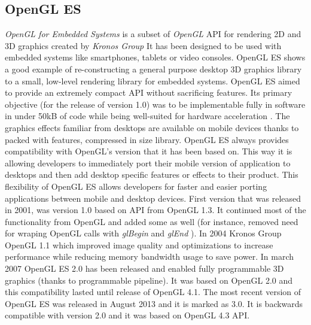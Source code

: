 \subsection{OpenGL ES}
\emph{OpenGL for Embedded Systems} \cite{opengles_kronos} is a subset of \emph{OpenGL} \cite{opengl_kronos} API for rendering 2D and 3D graphics created by \emph{Kronos Group} \cite{kronos_group} 
It has been designed to be used with embedded systems like smartphones, tablets or video consoles.
OpenGL ES shows a good example of re-constructing a general purpose desktop 3D graphics library to a small, low-level rendering library for embedded systems.
OpenGL ES aimed to provide an extremely compact API without sacrificing features.
Its primary objective (for the release of version 1.0) was to be implementable fully in software in under 50kB of code while being well-suited for hardware acceleration \cite{mobile_3d_graphics_with_OGLES_M3G}.
The graphics effects familiar from desktops are available on mobile devices thanks to packed with features, compressed in size library.
\newline OpenGL ES always provides compatibility with OpenGL's version that it has been based on.
This way it is allowing developers to immediately port their mobile version of application to desktops and then add desktop specific features or effects to their product.
This flexibility of OpenGL ES allows developers for faster and easier porting applications between mobile and desktop devices.
\newline First version that was released in 2001, was version 1.0 based on API from OpenGL 1.3.
It continued most of the functionality from OpenGL and added some as well (for instance, removed need for wraping OpenGL calls with \emph{glBegin} and \emph{glEnd} ).
\newline In 2004 Kronos Group OpenGL 1.1 which improved image quality and optimizations to increase performance while reducing memory bandwidth usage to save power.
\newline In march 2007 OpenGL ES 2.0 has been released and enabled fully programmable 3D graphics (thanks to programmable pipeline).
It was based on OpenGL 2.0 and this compatibility lasted until release of OpenGL 4.1.
\newline The most recent version of OpenGL ES was released in August 2013 and it is marked as 3.0.
It is backwards compatible with version 2.0 and it was based on OpenGL 4.3 API.

